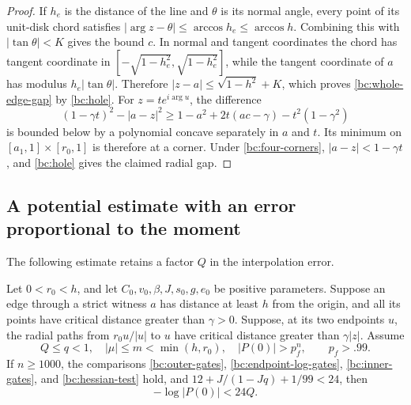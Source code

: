 \begin{proof}
If $h_e$ is the distance of the line and $\theta$ is its normal
angle, every point of its unit-disk chord satisfies
$|\arg z-\theta|\leq\arccos h_e\leq\arccos h$.
Combining this with $|\tan\theta|<K$ gives the bound $c$.
In normal and tangent coordinates the chord has tangent coordinate
in $[-\sqrt{1-h_e^2},\sqrt{1-h_e^2}]$, while the tangent
coordinate of $a$ has modulus $h_e|\tan\theta|$.  Therefore
$|z-a|\leq\sqrt{1-h^2}+K$, which proves
\eqref{bc:whole-edge-gap} by \eqref{bc:hole}.
For $z=t e^{i\arg u}$, the difference
\[
 (1-\gamma t)^2-|a-z|^2
 \geq1-a^2+2t(ac-\gamma)-t^2(1-\gamma^2)
\]
is bounded below by a polynomial concave separately in $a$ and $t$.
Its minimum on $[a_1,1]\times[r_0,1]$ is therefore at a corner.
Under \eqref{bc:four-corners}, $|a-z|<1-\gamma t$, and
\eqref{bc:hole} gives the claimed radial gap.
\end{proof}

\subsection{A potential estimate with an error proportional to the moment}

The following estimate retains a factor $Q$ in the interpolation error.

\begin{lemma}\label{bc:endpoint-potential}
Let $0<r_0<h$, and let $C_0,v_0,\beta,J,s_0,g,e_0$
be positive parameters.
Suppose an edge through a strict witness $a$ has distance at least $h$
from the origin, and all its points have critical distance greater than
$\gamma>0$.  Suppose, at its two endpoints $u$, the radial paths
from $r_0u/|u|$ to $u$ have critical distance greater than
$\gamma|z|$.  Assume
\[
 Q\leq q<1,\quad |\mu|\leq m<\min(h,r_0),\quad
 |P(0)|>p_f^n,\qquad p_f>.99.
\]
If $n\geq1000$, the comparisons
\eqref{bc:outer-gates}, \eqref{bc:endpoint-log-gates},
\eqref{bc:inner-gates}, and \eqref{bc:hessian-test} hold, and
$12+J/(1-Jq)+1/99<24$, then
\begin{equation}\label{bc:potential-24}
 -\log|P(0)|<24Q.
\end{equation}
\end{lemma}

